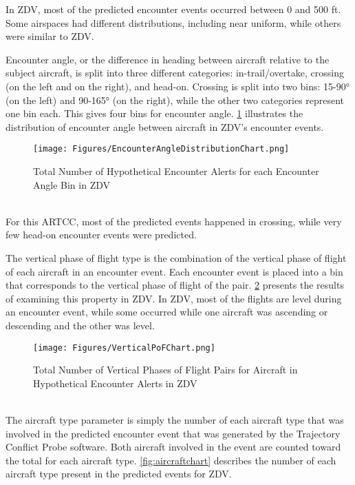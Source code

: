In ZDV, most of the predicted encounter events occurred between 0 and 500 ft. Some airspaces had different distributions, including near uniform, while others were similar to ZDV.

Encounter angle, or the difference in heading between aircraft relative to the subject aircraft, is split into three different categories: in-trail/overtake, crossing (on the left and on the right), and head-on. Crossing is split into two bins: 15-90° (on the left) and 90-165° (on the right), while the other two categories represent one bin each. This gives four bins for encounter angle. \ref{fig:encanglechart} illustrates the distribution of encounter angle between aircraft in ZDV’s encounter events.

\begin{figure}[H]
\centering
\texttt{[image: Figures/EncounterAngleDistributionChart.png]}
\caption{Total Number of Hypothetical Encounter Alerts for each Encounter Angle Bin in ZDV}
\label{fig:encanglechart}
\end{figure}
~\\

For this ARTCC, most of the predicted events happened in crossing, while very few head-on encounter events were predicted.

The vertical phase of flight type is the combination of the vertical phase of flight of each aircraft in an encounter event. Each encounter event is placed into a bin that corresponds to the vertical phase of flight of the pair. \ref{fig:vpofchart} presents the results of examining this property in ZDV. In ZDV, most of the flights are level during an encounter event, while some occurred while one aircraft was ascending or descending and the other was level.

\begin{figure}[H]
\centering
\texttt{[image: Figures/VerticalPoFChart.png]}
\caption{Total Number of Vertical Phases of Flight Pairs for Aircraft in Hypothetical Encounter Alerts in ZDV}
\label{fig:vpofchart}
\end{figure}
~\\

The aircraft type parameter is simply the number of each aircraft type that was involved in the predicted encounter event that was generated by the Trajectory Conflict Probe software. Both aircraft involved in the event are counted toward the total for each aircraft type. \ref{fig:aircraftchart} describes the number of each aircraft type present in the predicted events for ZDV.

